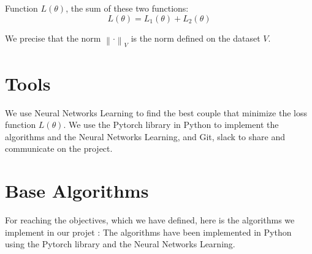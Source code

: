 \documentclass{article}
\begin{document}
    Function $L(\theta)$, the sum of these two functions:
    \[
    L(\theta) = L_1(\theta) + L_2(\theta)
    \]

    We  precise that the norm $\left\lVert \cdot \right\rVert_{V}$ is the norm defined on the dataset $V$.

\section{Tools}
    We use Neural Networks Learning to find the best couple that minimize the loss function $L(\theta)$.
    We use the Pytorch library in Python to implement the algorithms and the Neural Networks Learning, and Git, slack to share and communicate on the project.

\section{Base Algorithms}
    For reaching the objectives, which we have defined, here is the algorithms we implement in our projet  : 
    The algorithms have been implemented in Python using the Pytorch library and the Neural Networks Learning.\\
\end{document}
